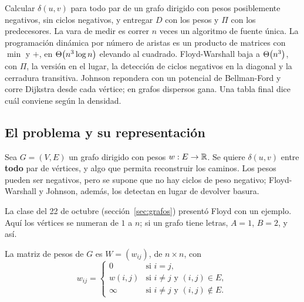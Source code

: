 \documentclass[11pt,letterpaper]{article}
\begin{document}
\newpage


\label{sec:todos-pares}

\begin{quick_sum}
  Calcular $\delta(u, v)$ para todo par de un grafo dirigido con pesos
  posiblemente negativos, sin ciclos negativos, y entregar $D$ con los
  pesos y $\Pi$ con los predecesores. La vara de medir es correr $n$
  veces un algoritmo de fuente única. La programación dinámica por
  número de aristas es un producto de matrices con $\min$ y $+$, en
  $\Theta\!\left(n^3 \log n\right)$ elevando al cuadrado. Floyd-Warshall baja a
  $\Theta\!\left(n^3\right)$, con $\Pi$, la versión en el lugar, la detección de
  ciclos negativos en la diagonal y la cerradura transitiva. Johnson
  repondera con un potencial de Bellman-Ford y corre Dijkstra desde
  cada vértice; en grafos dispersos gana. Una tabla final dice cuál
  conviene según la densidad.
\end{quick_sum}

\subsection*{El problema y su representación}

Sea $G = (V, E)$ un grafo dirigido con pesos $w : E \to \mathbb{R}$. Se quiere
$\delta(u, v)$ entre \textbf{todo} par de vértices, y algo que permita
reconstruir los caminos. Los pesos pueden ser negativos, pero se
supone que no hay ciclos de peso negativo; Floyd-Warshall y Johnson,
además, los detectan en lugar de devolver basura.

La clase del 22 de octubre (sección~\ref{sec:grafos}) presentó Floyd
con un ejemplo. Aquí los vértices se numeran de $1$ a $n$; si un grafo
tiene letras, $A = 1$, $B = 2$, y así.

\begin{definicion}
  \label{def:matriz-pesos-pares}
  La matriz de pesos de $G$ es $W = (w_{ij})$, de $n \times n$, con
  \[
    w_{ij} = \begin{cases}
      0 & \text{si } i = j, \\
      w(i, j) & \text{si } i \neq j \text{ y } (i, j) \in E, \\
      \infty & \text{si } i \neq j \text{ y } (i, j) \notin E.
    \end{cases}
  \]
\end{definicion}
\end{document}
